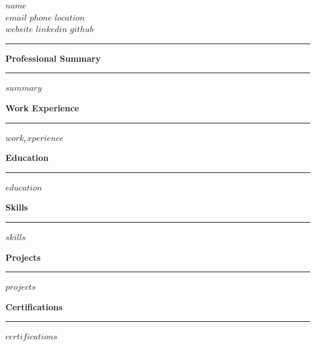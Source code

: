 \documentclass[11pt,a4paper]{article}
\newcommand{\SectionHeaderStyle}[1]{{%
  \vspace{8pt}%
  {\Large\bfseries\textcolor{accent1}{#1}}%
  \vspace{2pt}%
  \noindent\textcolor{accent1}{\rule{\textwidth}{2pt}}%
  \vspace{6pt}
}}
\begin{document}
\begin{center}
{\fontsize{32pt}{36pt}\selectfont\bfseries\textcolor{darktext}{$name$}}\\[3pt]
{\normalsize\textcolor{subtlegray}{$email$ \quad $phone$ \quad $location$}}\\[2pt]
{\small\textcolor{subtlegray}{$website$ $linkedin$ $github$}}
\end{center}

\vspace{10pt}
{\noindent\textcolor{accent1}{\rule{\textwidth}{0.5pt}}}
\vspace{8pt}

\SectionHeaderStyle{Professional Summary}
$summary$

\SectionHeaderStyle{Work Experience}
$work_experience$

\SectionHeaderStyle{Education}
$education$

\SectionHeaderStyle{Skills}
$skills$

\SectionHeaderStyle{Projects}
$projects$

\SectionHeaderStyle{Certifications}
$certifications$
\end{document}
